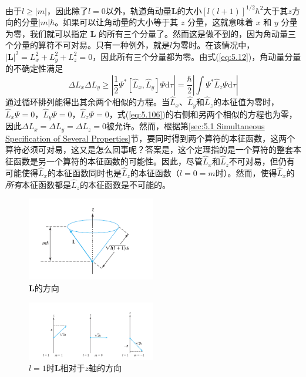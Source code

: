     由于$l \ge \left|m\right|$，因此除了$l=0$以外，轨道角动量$\mathbf{L}$的大小$\left[l\left(l+1\right)\right]^{1/2}\hbar^2$大于其$z$方向的分量$\left|m\right|\hbar$。如果可以让角动量的大小等于其 $z$ 分量，这就意味着 $x$ 和 $y$ 分量为零，我们就可以指定 $\mathbf{L}$ 的所有三个分量了。然而这是做不到的，因为角动量三个分量的算符不可对易。只有一种例外，就是$l$为零时。在该情况中，$\left|\mathbf{L}\right|^2 = L_x^2+ L_y^2 + L_z^2 = 0$，因此所有三个分量都为零。由式(\ref{eq:5.12})，角动量分量的不确定性满足
    \begin{equation}
        \Delta L_x\Delta L_y \ge \left|\frac{1}{2}\Psi^{\ast}\left[\hat{L}_x,\hat{L}_y\right]\Psi\mathrm{d}\tau\right| = \frac{\hbar}{2}\left|\int \Psi^{\ast}\hat{L}_z\Psi\mathrm{d}\tau\right|
        \label{eq:5.106}
    \end{equation}
    通过循环排列能得出其余两个相似的方程。当$\hat{L}_x$、$\hat{L}_y$和$\hat{L}_z$的本征值为零时，$\hat{L}_x\Psi = 0$，$\hat{L}_y\Psi = 0$，$\hat{L}_z\Psi = 0$，式(\ref{eq:5.106})的右侧和另两个相似的方程也为零，因此$\Delta L_x = \Delta L_y = \Delta L_z = 0$被允许。然而，根据第\ref{sec:5.1 Simultaneous Specification of Several Properties}节，要同时得到两个算符的本征函数，这两个算符必须可对易，这又是怎么回事呢？答案是，这个定理指的是一个算符的整套本征函数是另一个算符的本征函数的可能性。因此，尽管$\hat{L}_x$和$\hat{L}_z$不可对易，但仍有可能使得$\hat{L}_x$的本征函数同时也是$\hat{L}_z$的本征函数（$l=0=m$时）。然而，使得$\hat{L}_x$的\textit{所有}本征函数都是$\hat{L}_z$的本征函数是不可能的。
    \begin{figure}[h!]
        \centering
        \includegraphics[width=0.5\textwidth]{Figures/5.6.png}
        \caption{$\mathbf{L}$的方向}
        \label{fig:5.6}
    \end{figure}
    \begin{figure}
        \centering
        \includegraphics[width=0.5\textwidth]{Figures/5.7.png}
        \caption{$l=1$时$\mathbf{L}$相对于$z$轴的方向}
        \label{fig:5.7}
    \end{figure}

